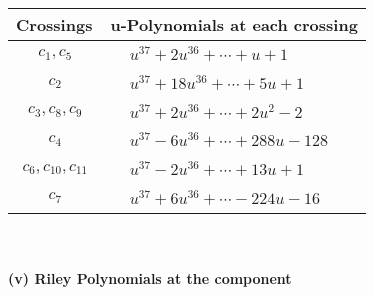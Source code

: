\documentclass[1p]{elsarticle_modified}
\theoremstyle{definition}
\begin{document}
\begin{tabular}{m{50pt}|m{274pt}}
Crossings & \hspace{64pt}u-Polynomials at each crossing \\
\hline $$\begin{aligned}c_{1},c_{5}\end{aligned}$$&$\begin{aligned}
&u^{37}+2 u^{36}+\cdots+u+1
\end{aligned}$\\
\hline $$\begin{aligned}c_{2}\end{aligned}$$&$\begin{aligned}
&u^{37}+18 u^{36}+\cdots+5 u+1
\end{aligned}$\\
\hline $$\begin{aligned}c_{3},c_{8},c_{9}\end{aligned}$$&$\begin{aligned}
&u^{37}+2 u^{36}+\cdots+2 u^2-2
\end{aligned}$\\
\hline $$\begin{aligned}c_{4}\end{aligned}$$&$\begin{aligned}
&u^{37}-6 u^{36}+\cdots+288 u-128
\end{aligned}$\\
\hline $$\begin{aligned}c_{6},c_{10},c_{11}\end{aligned}$$&$\begin{aligned}
&u^{37}-2 u^{36}+\cdots+13 u+1
\end{aligned}$\\
\hline $$\begin{aligned}c_{7}\end{aligned}$$&$\begin{aligned}
&u^{37}+6 u^{36}+\cdots-224 u-16
\end{aligned}$\\
\hline
\end{tabular}\\~\\
\newpage\renewcommand{\arraystretch}{1}
\flushleft \textbf{(v) Riley Polynomials at the component}\newline \\
\end{document}
